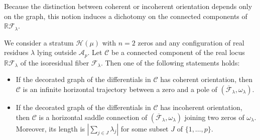 Because the distinction between coherent or incoherent orientation depends only on the graph, this notion induces a dichotomy on the connected components of $\mathbb{R}\mathcal{F}_{\lambda}$.

\begin{prop}\label{prop:REALlocus}
We consider a stratum $\mathcal{H}(\mu)$ with $n=2$ zeros and any configuration of real residues $\lambda$ lying outside $\mathcal{A}_{p}$. Let $\mathcal{C}$ be a connected component of the real locus $\mathbb{R}\mathcal{F}_{\lambda}$ of the isoresidual fiber $\mathcal{F}_{\lambda}$. Then one of the following statements holds:
\begin{itemize}
\item If the decorated graph of the differentials in $\mathcal{C}$ has coherent orientation, then $\mathcal{C}$ is an infinite horizontal trajectory between a zero and a pole of $(\overline{\mathcal{F}}_{\lambda},\omega_{\lambda})$.
\item If the decorated graph of the differentials in $\mathcal{C}$ has incoherent orientation, then $\mathcal{C}$ is a horizontal saddle connection of $(\overline{\mathcal{F}}_{\lambda},\omega_{\lambda})$ joining two zeros of $\omega_{\lambda}$. Moreover, its length is $|\sum_{j \in J} \lambda_{j}|$ for some subset $J$ of $\lbrace{ 1,\dots,p \rbrace}$.
\end{itemize}
\end{prop}

